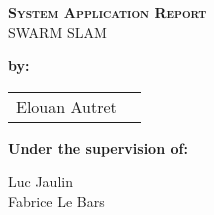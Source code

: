 
\begingroup
\thispagestyle{empty}
\begin{center}
\vspace*{2cm}
{\Huge \textsc{\textbf{System Application Report}}}\\


\vspace*{2cm}
{\huge SWARM SLAM}\par %
\end{center}
\begin{figure}[H]
\centering
\end{figure}

\vspace*{1.5cm}
\textbf{\large by:} 
\begin{center}
{\large
\begin{tabular}{cc}
Elouan Autret \\
\end{tabular}}
\end{center}


\vspace*{1.5 cm}
{\large \textbf{Under the supervision of:}}\\
\begin{center}
{\large
Luc Jaulin\\
Fabrice Le Bars\\}
\end{center}
\endgroup
